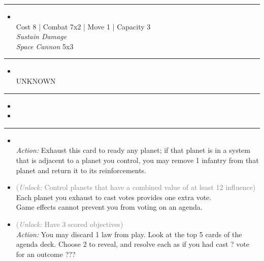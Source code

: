 \begin{multicols}{2}
\vspace{-10pt}\rule{\hsize}{0.4pt}\vspace{5pt}


\begin{itemize}
\item {}\\
Cost 8 | Combat 7x2 | Move 1 | Capacity 3 \\
\emph{Sustain Damage}\\
\emph{Space Cannon} 5x3
\end{itemize}

\vspace{-10pt}\rule{\hsize}{0.4pt}\vspace{5pt}


\begin{itemize}
\item {} %
\\
UNKNOWN
\end{itemize}

\vspace{-10pt}\rule{\hsize}{0.4pt}\vspace{5pt}

\nounits

\columnbreak
{}

\begin{itemize}
\item \instinct
\item \nullification
\end{itemize}

\vspace{-10pt}\rule{\hsize}{0.4pt}\vspace{5pt}


\begin{itemize}
\item {}\\
\emph{Action:}
Exhaust this card to ready any planet; if that planet is in a system that is adjacent to a planet you control, you may remove 1 infantry from that planet and return it to its reinforcements. 
\item {} \textcolor{gray}{(\emph{Unlock:} Control planets that have a combined value of at least 12 influence)}
Each planet you exhaust to cast votes provides one extra vote.\\
Game effects cannot prevent you from voting on an agenda.
\item {} \textcolor{gray}{(\emph{Unlock:} Have 3 scored objectives)}\\
\emph{Action:} You may discard 1 law from play. Look at the top 5 cards of the agenda deck. Choose 2 to reveal, and resolve each as if you had cast ? vote for an outcome ???
\end{itemize}


\end{multicols}
